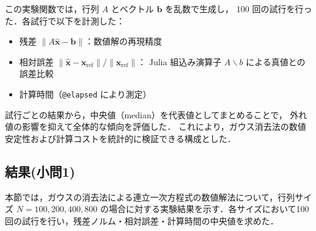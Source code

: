 \documentclass[a4paper,11pt]{ltjsarticle}
\begin{document}
この実験関数では，行列 $A$ とベクトル $\boldsymbol{b}$ を乱数で生成し，
100 回の試行を行った．各試行で以下を計測した：

\begin{itemize}
  \item 残差 $\|A\hat{\boldsymbol{x}}-\boldsymbol{b}\|$：数値解の再現精度
  \item 相対誤差 $\|\hat{\boldsymbol{x}}-\boldsymbol{x}_{\mathrm{ref}}\| / \|\boldsymbol{x}_{\mathrm{ref}}\|$：
        Julia 組込み演算子 $A\backslash b$ による真値との誤差比較
  \item 計算時間（\texttt{@elapsed} により測定）
\end{itemize}

試行ごとの結果から，中央値（median）を代表値としてまとめることで，
外れ値の影響を抑えて全体的な傾向を評価した．
これにより，ガウス消去法の数値安定性および計算コストを統計的に検証できる構成とした．


\subsection{結果(小問1)}
本節では，ガウスの消去法による連立一次方程式の数値解法について，行列サイズ $N=100, 200, 400, 800$ の場合に対する実験結果を示す．各サイズにおいて100回の試行を行い，残差ノルム・相対誤差・計算時間の中央値を求めた．
\end{document}
